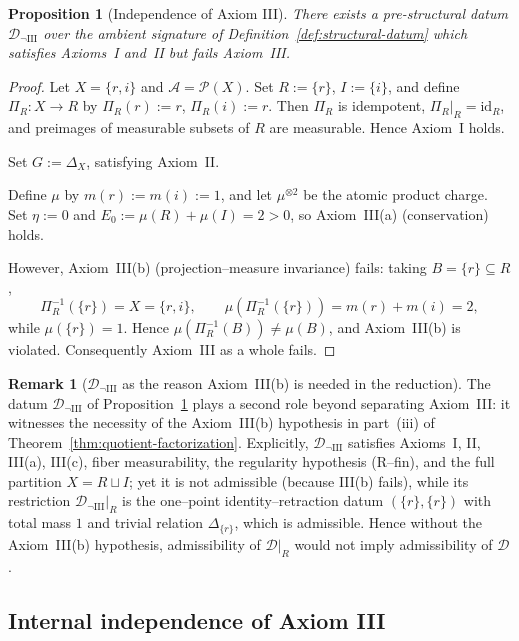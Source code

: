 \documentclass[11pt]{article}
\numberwithin{equation}{section}
\newtheorem{proposition}[theorem]{Proposition}
\theoremstyle{definition}
\newtheorem{remark}[theorem]{Remark}
\begin{document}
\begin{proposition}[Independence of Axiom III]\label{prop:indep-III}
There exists a pre-structural datum $\mathcal D_{\neg \mathrm{III}}$ over the ambient signature of Definition~\ref{def:structural-datum} which satisfies Axioms~I and~II but fails Axiom~III.
\end{proposition}

\begin{proof}
Let $X=\{r,i\}$ and $\mathcal A=\mathcal P(X)$. Set $R:=\{r\}$, $I:=\{i\}$, and define $\Pi_R:X\to R$ by $\Pi_R(r):=r$, $\Pi_R(i):=r$. Then $\Pi_R$ is idempotent, $\Pi_R|_R=\mathrm{id}_R$, and preimages of measurable subsets of $R$ are measurable. Hence Axiom~I holds.

Set $G:=\Delta_X$, satisfying Axiom~II.

Define $\mu$ by $m(r):=m(i):=1$, and let $\mu^{\otimes2}$ be the atomic product charge. Set $\eta:=0$ and $E_0:=\mu(R)+\mu(I)=2>0$, so Axiom~III(a) (conservation) holds.

However, Axiom~III(b) (projection--measure invariance) fails: taking $B=\{r\}\subseteq R$,
\[
\Pi_R^{-1}(\{r\})=X=\{r,i\},
\qquad
\mu(\Pi_R^{-1}(\{r\}))=m(r)+m(i)=2,
\]
while $\mu(\{r\})=1$. Hence $\mu(\Pi_R^{-1}(B))\ne\mu(B)$, and Axiom~III(b) is violated. Consequently Axiom~III as a whole fails.
\end{proof}

\begin{remark}[$\mathcal D_{\neg \mathrm{III}}$ as the reason Axiom~III(b) is needed in the reduction]\label{rem:indep-III-as-counterexample}
The datum $\mathcal D_{\neg \mathrm{III}}$ of Proposition~\ref{prop:indep-III} plays a second role beyond separating Axiom~III: it witnesses the necessity of the Axiom~III(b) hypothesis in part~(iii) of Theorem~\ref{thm:quotient-factorization}. Explicitly, $\mathcal D_{\neg \mathrm{III}}$ satisfies Axioms~I, II, III(a), III(c), fiber measurability, the regularity hypothesis (R--fin), and the full partition $X=R\sqcup I$; yet it is not admissible (because III(b) fails), while its restriction $\mathcal D_{\neg\mathrm{III}}|_R$ is the one--point identity--retraction datum $(\{r\},\{r\})$ with total mass $1$ and trivial relation $\Delta_{\{r\}}$, which is admissible. Hence without the Axiom~III(b) hypothesis, admissibility of $\mathcal D|_R$ would not imply admissibility of $\mathcal D$.
\end{remark}

\subsection{Internal independence of Axiom III}\label{sec:indep-III-internal}
\end{document}
